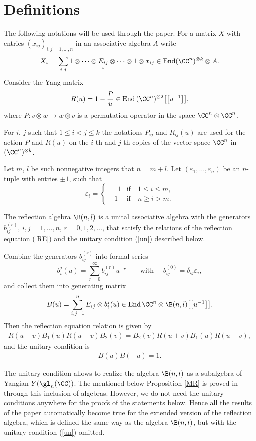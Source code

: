 \section{Def\/initions}\label{section1}
The following  notations will be used through the paper.
For a matrix  $X$ with entries $(x_{ij})_{i,j=1,\dots, n}$ in an  associative algebra $A$ write
\[
X_s=\sum_{i,j}1\otimes\dots\otimes \underset{s}{E_{ij}}\otimes\dots \otimes 1\otimes x_{ij} \in\operatorname{End}(\CC^n)^{\otimes k}\otimes A.
\]
 Consider the Yang matrix
\[
R(u)=1-\frac{P}{u}  \in \text{End}\,(\CC^n)^{\otimes 2}\big[\big[u^{-1}\big]\big],
\]
where $P:v\otimes w\to w\otimes v$ is a permutation operator in the space $\CC^n\otimes\CC^n$.

 For $i$, $j$ such that $1\le i < j\le k$ the notations $P_{ij}$ and
  $R_{ij}(u)$   are used  for the  action $P$ and  $R(u)$ on the $i$-th and $j$-th copies of  the vector space $\CC^n$ in $(\CC^n)^{\otimes k}$.

 Let $m$, $l$ be such nonnegative integers that $n=m+l$. Let $(\varepsilon _1,\dots, \varepsilon_n)$ be an $n$-tuple with entries $\pm 1$, such that
\[
 \varepsilon_i=
 \begin{cases}
\phantom{-}1& \text{if}\quad 1\le i\le m,\\
 {-}1& \text{if}\quad n\ge i> m.
 \end{cases}
\]

 The ref\/lection algebra $\B(n,l)$ is a unital associative algebra with the generators $b_{ij}^{(r)}$, $i,j=1,\dots, n$, $r= 0,1, 2,\dots $, that satisfy the  relations of the ref\/lection equation (\ref{RE}) and the unitary condition (\ref{un}) described below.

Combine the generators $b_{ij}^{(r)}$ into formal series
\[
b_i^{j}(u)=\sum_{r=0}^{\infty}b_{ij}^{(r)}u^{-r}\qquad \text{with }\quad
b^{(0)}_{ij}=\delta_{ij}\varepsilon_{i},
\]
and collect them into generating matrix
\[
B(u)=\sum_{i,j=1}^{n} E_{ij}\otimes b_i^{j}(u)\in \text{End}\, \CC^n\otimes \B(n,l)\big[\big[u^{-1}\big]\big].
\]
Then the ref\/lection equation  relation is given by
\begin{gather}\label{RE}
R(u-v)B_1(u)R(u+v)B_2(v)=B_2(v)R(u+v)B_1(u)R(u-v),
\end{gather}
and the unitary condition  is
\begin{gather}\label{un}
B(u)B(-u)=1.
\end{gather}


\begin{remark}  The unitary condition allows to realize the algebra $\B(n,l)$ as a subalgebra of Yangian  $Y(\gl_n(\CC))$. The mentioned below Proposition \ref{MR} is proved in \cite{MR}  through this inclusion of algebras.
However, we do not need the unitary conditions anywhere for the proofs of the statements below. Hence all the results of the paper automatically become true for the extended version of the ref\/lection algebra, which is def\/ined the same way as the algebra  $\B(n,l)$, but with the unitary condition (\ref{un}) omitted.
\end{remark}

